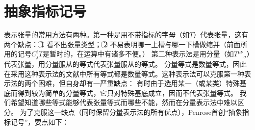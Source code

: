 \section{抽象指标记号}
表示张量的常用方法有两种。第一种是用不带指标的字母（如$T$）代表张量，这有两个缺点：
\textcircled{1} 看不出张量类型；
\textcircled{2} 不易表明哪一上槽与哪一下槽做缩并（前面所用的记号$C^i_jT$是暂时的，在运算中有诸多不便。）
第二种表示法是用分量（如$T^{\mu\nu}{}_\sigma$）代表张量，用分量服从的等式代表张量服从的等式。
分量等式是数量等式，因此在采用这种表示法的文献中所有等式都是数量等式。这种表示法可以克服第一种表示法的两个困难，但自身却有一严重缺点：
有时由于选用某一（或某类）特殊基底而得到较为简单的分量等式，它只对特殊基底成立，因而不代表张量等式。
我们希望知道哪些等式能够代表张量等式而哪些不能，然而在分量表示法中难以区分。
为了克服这一缺点（同时保留分量表示法的所有优点），Penrose首创``抽象指标记号''，要点如下：
